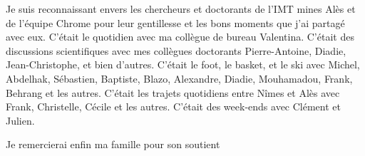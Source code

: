 Je suis reconnaissant envers les chercheurs et doctorants de l'IMT mines Alès et de l'équipe Chrome pour leur gentillesse et les bons moments que j'ai partagé avec eux. C'était le quotidien avec ma collègue de bureau Valentina. C'était des discussions scientifiques avec mes collègues doctorants Pierre-Antoine, Diadie, Jean-Christophe, et bien d'autres. C'était le foot, le basket, et le ski avec Michel, Abdelhak, Sébastien, Baptiste, Blazo, Alexandre, Diadie, Mouhamadou, Frank, Behrang et les autres. C'était les trajets quotidiens entre Nîmes et Alès avec Frank, Christelle, Cécile et les autres. C'était des week-ends avec Clément et Julien.

Je remercierai enfin ma famille pour son soutient%